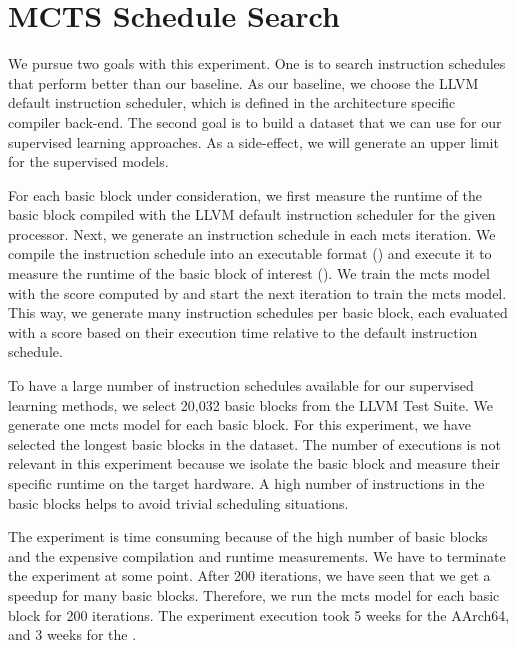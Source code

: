 \section{MCTS Schedule Search}
\label{sec:eval:mcts}
We pursue two goals with this experiment.
One is to search instruction schedules that perform better than our baseline.
As our baseline, we choose the LLVM default instruction scheduler, which is defined in the architecture specific compiler back-end.
The second goal is to build a dataset that we can use for our supervised learning approaches.
As a side-effect, we will generate an upper limit for the supervised models.

For each basic block under consideration, we first measure the runtime of the basic block compiled with the LLVM default instruction scheduler for the given processor.
Next, we generate an instruction schedule in each \ac{mcts} iteration.
We compile the instruction schedule into an executable format () and execute it to measure the runtime of the basic block of interest ().
We train the \ac{mcts} model with the score computed by  and start the next iteration to train the \ac{mcts} model.
This way, we generate many instruction schedules per basic block, each evaluated with a score based on their execution time relative to the default instruction schedule.


To have a large number of instruction schedules available for our supervised learning methods, we select 20,032 basic blocks from the LLVM Test Suite. 
We generate one \ac{mcts} model for each basic block.
For this experiment, we have selected the longest basic blocks in the dataset.
The number of executions is not relevant in this experiment because we isolate the basic block and measure their specific runtime on the target hardware.
A high number of instructions in the basic blocks helps to avoid trivial scheduling situations.

The experiment is time consuming because of the high number of basic blocks and the expensive compilation and runtime measurements.
We have to terminate the experiment at some point.
After 200 iterations, we have seen that we get a speedup for many basic blocks.
Therefore, we run the \ac{mcts} model for each basic block for 200 iterations.
The experiment execution took 5 weeks for the AArch64, and 3 weeks for the \aurora.

